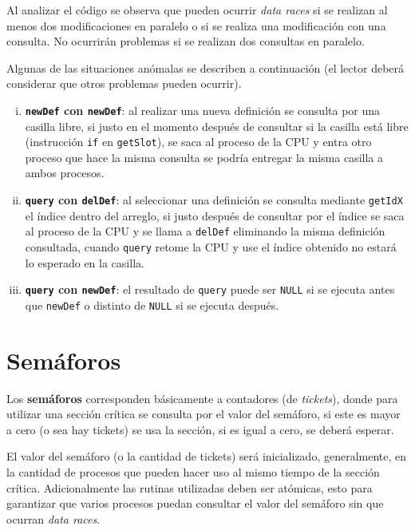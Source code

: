 Al analizar el código se observa que pueden ocurrir \emph{data races} si se
realizan al menos dos modificaciones en paralelo o si se realiza una
modificación con una consulta. No ocurrirán problemas si se realizan dos
consultas en paralelo.

Algunas de las situaciones anómalas se describen a continuación (el lector
deberá considerar que otros problemas pueden ocurrir).

\begin{enumerate}[i.]

\item \textbf{\texttt{newDef} con \texttt{newDef}}: al realizar una nueva
definición se consulta por una casilla libre, si justo en el momento después de
consultar si la casilla está libre (instrucción \texttt{if} en
\texttt{getSlot}), se saca al proceso de la CPU y entra otro proceso que hace la
misma consulta se podría entregar la misma casilla a ambos procesos.

\item \textbf{\texttt{query} con \texttt{delDef}}: al seleccionar una
definición se consulta mediante \texttt{getIdX} el índice dentro del arreglo, si
justo después de consultar por el índice se saca al proceso de la CPU y se llama
a \texttt{delDef} eliminando la misma definición consultada, cuando
\texttt{query} retome la CPU y use el índice obtenido no estará lo esperado en
la casilla.

\item \textbf{\texttt{query} con \texttt{newDef}}: el resultado de
\texttt{query} puede ser \texttt{NULL} si se ejecuta antes que \texttt{newDef} o
distinto de \texttt{NULL} si se ejecuta después.

\end{enumerate}

\section{Semáforos}
Los \textbf{semáforos} corresponden básicamente a contadores (de
\emph{tickets}), donde para utilizar una sección crítica se consulta por el
valor del semáforo, si este es mayor a cero (o sea hay tickets) se usa la
sección, si es igual a cero, se deberá esperar.

El valor del semáforo (o la cantidad de tickets) será inicializado,
generalmente, en la cantidad de procesos que pueden hacer uso al mismo tiempo de
la sección crítica. Adicionalmente las rutinas utilizadas deben ser atómicas,
esto para garantizar que varios procesos puedan consultar el valor del semáforo
sin que ocurran \emph{data races}.

